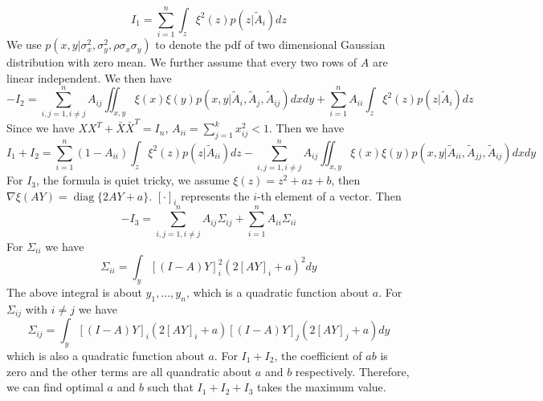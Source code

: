 \documentclass{article}
\DeclareMathOperator*{\diag}{diag}
\begin{document}
\begin{equation*}
I_1 = \sum_{i=1}^n \int_z \xi^2(z) p(z| \widetilde{A}_{i}) dz
\end{equation*}
We use $p(x,y | \sigma^2_x, \sigma^2_y, \rho \sigma_x \sigma_y)$ to denote the pdf of two dimensional Gaussian distribution with zero mean. 
We further assume that every two rows of $A$ are linear independent.
We then have
\begin{equation*}
-I_2   = \sum_{i,j=1, i \neq j}^n A_{ij} \iint_{x,y} \xi(x)\xi(y) p(x,y| \widetilde{A}_{i}, \widetilde{A}_{j}, \widetilde{A}_{ij}) dx dy + \sum_{i=1}^n A_{ii} \int_z \xi^2(z) p(z | \widetilde{A}_i) dz 
\end{equation*}
Since we have $XX^T + \bar{X}\bar{X}^T = I_n$, $A_{ii} = \sum_{j=1}^k x^2_{ij} < 1$. Then we have
\begin{equation*}
I_1+ I_2 =   \sum_{i=1}^n (1-A_{ii}) \int_z \xi^2(z) p(z | \widetilde{A}_{ii}) dz  - \sum_{i,j=1, i \neq j}^n A_{ij} \iint_{x,y} \xi(x)\xi(y) p(x,y| \widetilde{A}_{ii}, \widetilde{A}_{jj}, \widetilde{A}_{ij}) dx dy
\end{equation*}
For $I_3$, the formula is quiet tricky, we assume $\xi(z) = z^2 + a z + b $, then $\nabla \xi (AY) = \diag\{2AY+ a\}$. $[\cdot]_i$ represents the $i$-th element of a vector.
Then
\begin{equation*}
-I_3 = \sum_{i,j=1, i \neq j}^n A_{ij}\Sigma_{ij} + \sum_{i=1}^n A_{ii}\Sigma_{ii}
\end{equation*}
For $\Sigma_{ii}$ we have
\begin{equation*}
\Sigma_{ii} = \int_y [(I - A)Y]^2_i (2[AY]_i + a)^2 dy
\end{equation*}
The above integral is about $y_1, \dots, y_n$, which is a quadratic function about $a$.
For $\Sigma_{ij}$ with $i\neq j$ we have
\begin{equation*}
\Sigma_{ij} = \int_y [(I - A)Y]_i (2[AY]_i + a)[(I - A)Y]_j (2[AY]_j + a) dy
\end{equation*}
which is also a quadratic function about $a$.
For $I_1 + I_2$, the coefficient of $ab$ is zero and the other terms are all quandratic about $a$ and $b$ respectively. Therefore, we can find optimal $a$ and $b$ such that $I_1 + I_2 + I_3$ takes the maximum value.
\end{document}
